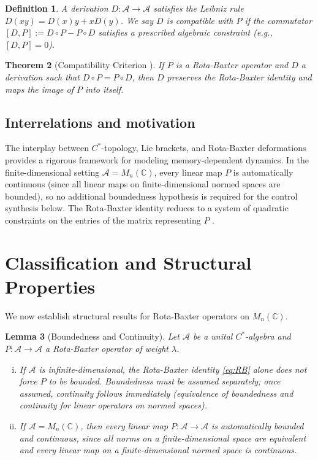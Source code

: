 \documentclass[10pt]{amsart}
\newcommand{\Ac}{\mathcal{A}}
\numberwithin{equation}{section}
\newtheorem{theorem}{Theorem}[section]
\newtheorem{lemma}[theorem]{Lemma}
\newtheorem{definition}[theorem]{Definition}
\begin{document}
\begin{definition}
A derivation \(D : \Ac \to \Ac\) satisfies the Leibniz rule \(D(xy) = D(x)y + x D(y)\).
We say \(D\) is \emph{compatible} with \(P\) if the commutator
\([D, P] := D\circ P - P\circ D\) satisfies a prescribed algebraic constraint
(e.g., \([D,P]=0\)).
\end{definition}

\begin{theorem}[Compatibility Criterion {\cite[Theorem~3.1]{Bai2023}}]\label{thm:compat}
If \(P\) is a Rota-Baxter operator and \(D\) a derivation such that
\(D\circ P = P\circ D\), then \(D\) preserves the Rota-Baxter identity and maps the
image of \(P\) into itself.
\end{theorem}

\subsection{Interrelations and motivation}
The interplay between \(C^*\)-topology, Lie brackets, and Rota-Baxter deformations
provides a rigorous framework for modeling memory-dependent dynamics. In the
finite-dimensional setting $\Ac = M_n(\mathbb{C})$, every linear map $P$ is automatically
continuous (since all linear maps on finite-dimensional normed spaces are bounded), so no
additional boundedness hypothesis is required for the control synthesis below. The
Rota-Baxter identity reduces to a system of quadratic constraints on the entries of the
matrix representing $P$ \cite{BenGeloun2021}.


\section{Classification and Structural Properties}\label{sec:classification}
We now establish structural results for Rota-Baxter operators on \(M_n(\mathbb{C})\).

\begin{lemma}[Boundedness and Continuity]\label{lem:bounded}
Let \(\Ac\) be a unital \(C^*\)-algebra and \(P:\Ac\to\Ac\) a Rota-Baxter operator of
weight \(\lambda\).
\begin{enumerate}[(i)]
  \item If $\Ac$ is infinite-dimensional, the Rota-Baxter identity \eqref{eq:RB} alone
        does not force $P$ to be bounded. Boundedness must be assumed separately; once
        assumed, continuity follows immediately (equivalence of boundedness and continuity
        for linear operators on normed spaces).
  \item If \(\Ac = M_n(\mathbb{C})\), then every linear map \(P:\Ac\to\Ac\) is
        automatically bounded and continuous, since all norms on a finite-dimensional
        space are equivalent and every linear map on a finite-dimensional normed space
        is continuous.
\end{enumerate}
\end{lemma}
\end{document}
